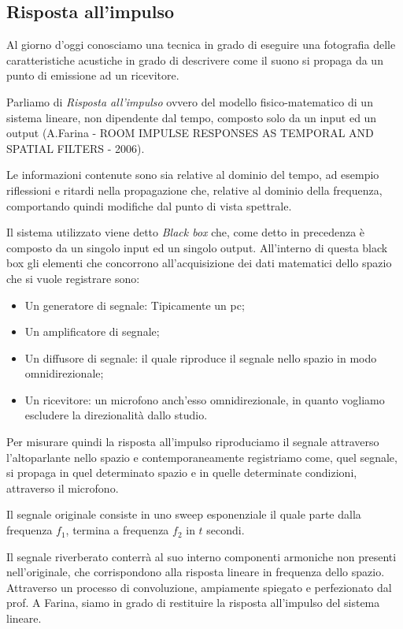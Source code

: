 \subsection{Risposta all'impulso}
Al giorno d’oggi conosciamo una tecnica in grado di eseguire una fotografia delle caratteristiche acustiche in grado di descrivere come il suono si propaga da un punto di emissione ad un ricevitore. 

Parliamo di \textit{Risposta all’impulso} ovvero del modello fisico-matematico di un sistema lineare, non dipendente dal tempo, composto solo da un input ed un output (A.Farina - ROOM IMPULSE RESPONSES AS TEMPORAL AND SPATIAL FILTERS - 2006).

Le informazioni contenute sono sia relative al dominio del tempo, ad esempio riflessioni e ritardi nella propagazione che, relative al dominio della frequenza, comportando quindi modifiche dal punto di vista spettrale.

Il sistema utilizzato viene detto \textit{Black box} che, come detto in precedenza è composto da un singolo input ed un singolo output. All’interno di questa black box gli elementi che concorrono all’acquisizione dei dati matematici dello spazio che si vuole registrare sono:
\begin{itemize}
\item Un generatore di segnale: Tipicamente un pc;
\item Un amplificatore di segnale;
\item Un diffusore di segnale: il quale riproduce il segnale nello spazio in modo omnidirezionale;
\item Un ricevitore: un microfono anch’esso omnidirezionale, in quanto vogliamo escludere la direzionalità dallo studio.
\end{itemize}
Per misurare quindi la risposta all'impulso riproduciamo il segnale attraverso l’altoparlante nello spazio e contemporaneamente registriamo come, quel segnale, si propaga in quel determinato spazio e in quelle determinate condizioni, attraverso il microfono.

Il segnale originale consiste in uno sweep esponenziale il quale parte dalla frequenza $f_1$, termina a frequenza $f_2$ in $t$ secondi.

Il segnale riverberato conterrà al suo interno componenti armoniche non presenti nell’originale, che corrispondono alla risposta lineare in frequenza dello spazio.
Attraverso un processo di convoluzione, ampiamente spiegato e perfezionato dal prof. A Farina, siamo in grado di restituire la risposta all'impulso del sistema lineare.

